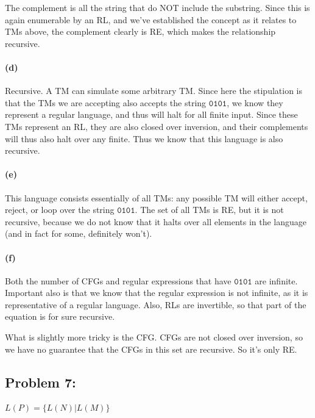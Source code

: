 \documentclass[a4paper]{article}
\begin{document}
The complement is all the string that do NOT include the substring. Since this is again enumerable by an RL, and we've established the concept as it relates to TMs above, the complement clearly is RE, which makes the relationship recursive.

\paragraph{(d)} Recursive. A TM can simulate some arbitrary TM. Since here the stipulation is that the TMs we are accepting also accepts the string $\texttt{0101}$, we know they represent a regular language, and thus will halt for all finite input. Since these TMs represent an RL, they are also closed over inversion, and their complements will thus also halt over any finite. Thus we know that this language is also recursive.

\paragraph{(e)} This language consists essentially of all TMs: any possible TM will either accept, reject, or loop over the string $\texttt{0101}$. The set of all TMs is RE, but it is not recursive, because we do not know that it halts over all elements in the language (and in fact for some, definitely won't).

\paragraph{(f)} Both the number of CFGs and regular expressions that have $\texttt{0101}$ are infinite. Important also is that we know that the regular expression is not infinite, as it is representative of a regular language. Also, RLs are invertible, so that part of the equation is for sure recursive.

What is slightly more tricky is the CFG. CFGs are not closed over inversion, so we have no guarantee that the CFGs in this set are recursive. So it's only RE.

\subsection*{Problem 7:}

$L(P) = \{ L(N) | L(M) \}$
\end{document}
